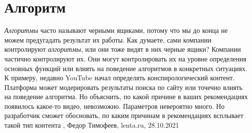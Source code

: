  
 
 
 
 
\chapter{Алгоритм}
\label{sec:slova.algoritm}

\emph{Алгоритмы} часто называют черными ящиками, потому что мы до конца не
можем предугадать результат их работы. Как думаете, сами компании контролируют
\emph{алгоритмы}, или они тоже видят в них черные ящики?  Компании частично
контролируют их. Они могут контролировать их на уровне определения основных
функций или влиять на поведение алгоритмов в конкретных ситуациях. К примеру,
недавно YouTube начал определять конспирологический контент. Платформа может
модерировать результаты поиска по сайту или точечно влиять на поведение
алгоритма. Но объяснить, по какой причине в ваших рекомендациях появилось
какое-то видео, невозможно. Параметров невероятно много. Но разработчик сможет
обосновать, по каким причинам в рекомендациях всплывает такой тип контента
, 
Федор Тимофеев, lenta.ru, 28.10.2021
